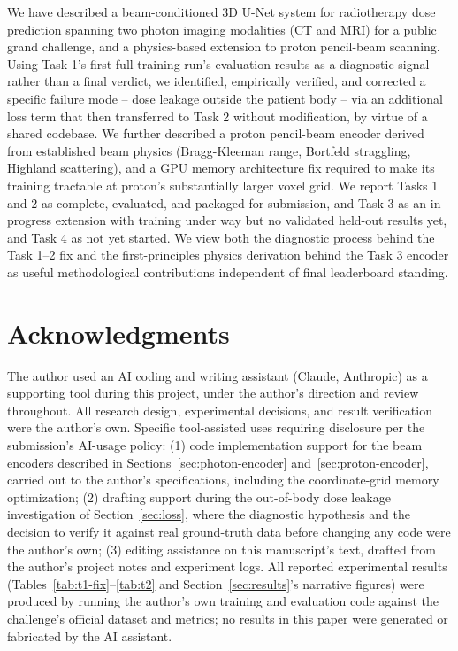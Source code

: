 \documentclass[10pt,conference]{IEEEtran}
\begin{document}
We have described a beam-conditioned 3D U-Net system for radiotherapy
dose prediction spanning two photon imaging modalities (CT and MRI) for
a public grand challenge, and a physics-based extension to proton
pencil-beam scanning. Using Task 1's first full training run's
evaluation results as a diagnostic signal rather than a final verdict,
we identified, empirically verified, and corrected a specific failure
mode -- dose leakage outside the patient body -- via an additional loss
term that then transferred to Task 2 without modification, by virtue of
a shared codebase. We further described a proton pencil-beam encoder
derived from established beam physics (Bragg-Kleeman range, Bortfeld
straggling, Highland scattering), and a GPU memory architecture fix
required to make its training tractable at proton's substantially larger
voxel grid. We report Tasks 1 and 2 as complete, evaluated, and packaged
for submission, and Task 3 as an in-progress extension with training
under way but no validated held-out results yet, and Task 4 as not yet
started. We view both the diagnostic process behind the Task 1--2 fix
and the first-principles physics derivation behind the Task 3 encoder as
useful methodological contributions independent of final leaderboard
standing.

\section*{Acknowledgments}

The author used an AI coding and writing assistant (Claude, Anthropic)
as a supporting tool during this project, under the author's direction
and review throughout. All research design, experimental decisions, and
result verification were the author's own. Specific tool-assisted uses
requiring disclosure per the submission's AI-usage policy: (1) code
implementation support for the beam encoders described in
Sections~\ref{sec:photon-encoder} and~\ref{sec:proton-encoder}, carried
out to the author's specifications, including the coordinate-grid
memory optimization; (2) drafting support during the out-of-body dose
leakage investigation of Section~\ref{sec:loss}, where the diagnostic
hypothesis and the decision to verify it against real ground-truth data
before changing any code were the author's own; (3) editing assistance
on this manuscript's text, drafted from the author's project notes and
experiment logs. All reported experimental results
(Tables~\ref{tab:t1-fix}--\ref{tab:t2} and
Section~\ref{sec:results}'s narrative figures) were produced by running
the author's own training and evaluation code against the challenge's
official dataset and metrics; no results in this paper were generated or
fabricated by the AI assistant.
\end{document}
